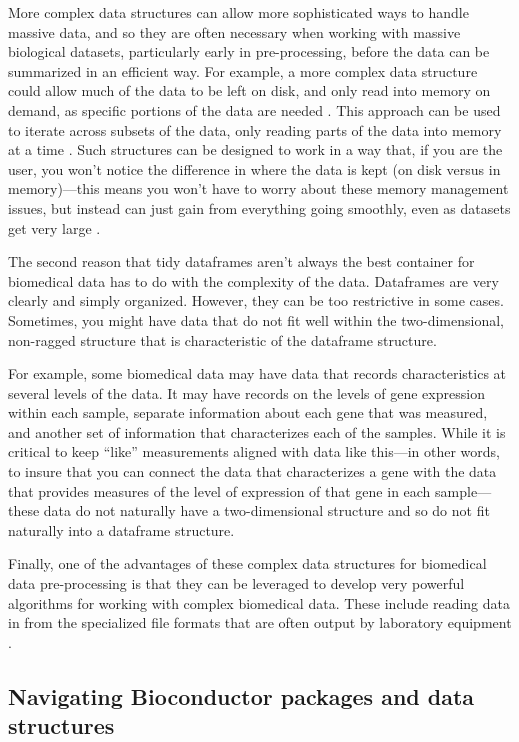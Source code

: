 \documentclass[]{tufte-book}
\begin{document}
More complex data structures can allow more sophisticated ways to handle massive
data, and so they are often necessary when working with massive biological
datasets, particularly early in pre-processing, before the data can be
summarized in an efficient way. For example, a more complex data structure could
allow much of the data to be left on disk, and only read into memory on demand,
as specific portions of the data are needed \citep{gatto2013msnbase, hicks2021mbkmeans}. This approach can be used to iterate across subsets of the
data, only reading parts of the data into memory at a time
\citep{lawrence2014scalable}. Such structures can be designed to work in a way that,
if you are the user, you won't notice the difference in where the data is kept
(on disk versus in memory)---this means you won't have to worry about these
memory management issues, but instead can just gain from everything going
smoothly, even as datasets get very large \citep{gatto2013msnbase}.

The second reason that tidy dataframes aren't always the best container for
biomedical data has to do with the complexity of the data. Dataframes are very
clearly and simply organized. However, they can be too restrictive in some
cases. Sometimes, you might have data that do not fit well within the
two-dimensional, non-ragged structure that is characteristic of the dataframe
structure.

For example, some biomedical data may have data that records characteristics at
several levels of the data. It may have records on the levels of gene expression
within each sample, separate information about each gene that was measured, and
another set of information that characterizes each of the samples.
While it is critical to keep ``like'' measurements aligned with data like
this---in other words, to insure that you can connect the data that
characterizes a gene with the data that provides measures of the level of
expression of that gene in each sample---these data do not naturally have a
two-dimensional structure and so do not fit naturally into a dataframe
structure.

Finally, one of the advantages of these complex data structures for biomedical
data pre-processing is that they can be leveraged to develop very powerful
algorithms for working with complex biomedical data. These include reading data
in from the specialized file formats that are often output by laboratory
equipment \citep{holmes2018modern}.

\subsection{Navigating Bioconductor packages and data structures}\label{navigating-bioconductor-packages-and-data-structures}
\end{document}
